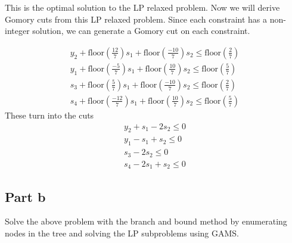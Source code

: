 \documentclass[11pt]{article}
\begin{document}
This is the optimal solution to the LP relaxed problem.
Now we will derive Gomory cuts from this LP relaxed problem.
Since each constraint has a non-integer solution, we can generate a Gomory cut on each constraint.

\begin{align*}
  y_2 + \text{floor}(\frac{12}{7}) s_1 + \text{floor}(\frac{-10}{7}) s_2 \leq \text{floor}(\frac{2}{7}) \\
  y_1 + \text{floor}(\frac{-5}{7}) s_1 + \text{floor}(\frac{10}{7}) s_2 \leq \text{floor}(\frac{5}{7}) \\
  s_3 + \text{floor}(\frac{5}{7}) s_1 + \text{floor}(\frac{-10}{7})s_2 \leq \text{floor}(\frac{2}{7}) \\
  s_4 + \text{floor}(\frac{-12}{7}) s_1 + \text{floor}(\frac{10}{7}) s_2 \leq \text{floor}(\frac{5}{7})
\end{align*}
These turn into the cuts
\begin{align*}
  y_2 + s_1 -2 s_2 \leq 0 \\
  y_1 - s_1 + s_2 \leq 0 \\
  s_3 -2 s_2 \leq 0 \\
  s_4 -2 s_1 + s_2 \leq 0
\end{align*}

\subsection{Part b}
Solve the above problem with the branch and bound method by enumerating nodes in the tree and solving the LP subproblems using GAMS.
\end{document}
